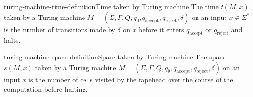 \documentclass[preview]{standalone}
\begin{document}
\genpage

\begin{snippetdefinition}{turing-machine-time-definition}{Time taken by Turing machine}
    The time $t(M, x)$ taken by a Turing machine $M=\left(\Sigma, \Gamma, Q, q_0, q_{\text {accept}}, q_{\text {reject}}, \delta\right)$
    on an input $x \in \Sigma^*$ is the number of transitions made by $\delta$ on $x$ before it enters $q_{\text {accept}}$ or $q_{\text {reject}}$ and halts.
\end{snippetdefinition}

\begin{snippetdefinition}{turing-machine-space-definition}{Space taken by Turing machine}
    The space $s(M, x)$ taken by a Turing machine $M=\left(\Sigma, \Gamma, Q, q_0, q_{\text {accept}}, q_{\text {reject}}, \delta\right)$
    on an input $x$ is the number of cells visited by the tapehead over the course of the computation before halting.
\end{snippetdefinition}
\end{document}
